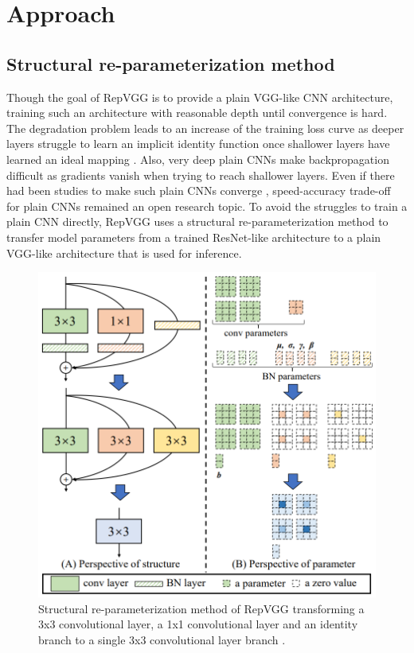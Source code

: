 \section{Approach} \label{approach}

\subsection{Structural re-parameterization method}

Though the goal of RepVGG is to provide a plain VGG-like CNN architecture, training such an architecture with reasonable depth until convergence is hard. The degradation problem leads to an increase of the training loss curve as deeper layers struggle to learn an implicit identity function once shallower layers have learned an ideal mapping \cite{KaimingHe.2015}. Also, very deep plain CNNs make backpropagation difficult as gradients vanish when trying to reach shallower layers. Even if there had been studies to make such plain CNNs converge \cite{LechaoXiao.2018, OyebadeKOyedotun.2020}, speed-accuracy trade-off for plain CNNs remained an open research topic. To avoid the struggles to train a plain CNN directly, RepVGG uses a structural re-parameterization method to transfer model parameters from a trained ResNet-like architecture to a plain VGG-like architecture that is used for inference. 

\begin{figure}[t]
	\begin{center}
		\includegraphics[width=\linewidth]{images/re-parameterization.PNG}
	\end{center}
	\caption{Structural re-parameterization method of RepVGG transforming a 3x3 convolutional layer, a 1x1 convolutional layer and an identity branch to a single 3x3 convolutional layer branch \cite{XiaohanDing.2021}.}
	\label{fig:reparameterization}
\end{figure}

